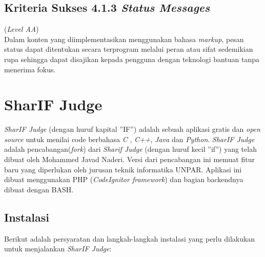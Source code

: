 \subsection{Kriteria Sukses 4.1.3 \textit{Status Messages}}
\label{subsec:kriteria_4.1.3}
(\textit{Level AA}) \\

Dalam konten yang diimplementasikan menggunakan bahasa \textit{markup}, pesan status dapat ditentukan secara terprogram melalui peran atau sifat sedemikian rupa sehingga dapat disajikan kepada pengguna dengan teknologi bantuan tanpa menerima fokus.

\section{SharIF Judge}
\label{sec:SharIF_Judge}
\textit{SharIF Judge} \cite{SharIF_Judge} (dengan huruf kapital ''IF'') adalah sebuah aplikasi gratis dan \textit{open source} untuk menilai code berbahasa \textit{C} , \textit{C++}, \textit{Java} dan \textit{Python}. \textit{SharIF Judge} adalah pencabangan(\textit{fork}) dari \textit{Sharif Judge} \cite{Sharif_Judge_Original} (dengan huruf kecil ''if'') yang telah dibuat oleh Mohammed Javad Naderi. Versi dari pencabangan ini memuat fitur baru yang diperlukan oleh jurusan teknik informatika UNPAR. Aplikasi ini dibuat menggunakan PHP (\textit{CodeIgnitor framework})\cite{Codeigniter} dan bagian backendnya dibuat dengan BASH.

\subsection{Instalasi}
\label{subsec:instalasi}
Berikut adalah persyaratan dan langkah-langkah instalasi yang perlu dilakukan untuk menjalankan \textit{SharIF Judge}:

